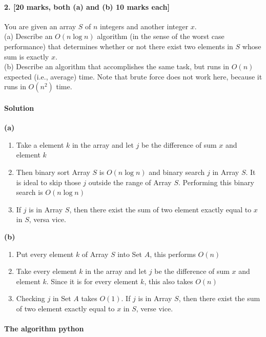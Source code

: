 \documentclass[a4paper]{scrartcl}
\begin{document}
\paragraph{2. [20 marks, both (a) and (b) 10 marks each]}

\label{sec:Question 2}
You are given an array $S$ of $n$ integers and
another integer $x$.\\
(a) Describe an $O(n \log{n})$ algorithm (in the sense of the worst case performance) that determines whether or not there exist two elements in $S$ whose sum is exactly $x$.\\
(b) Describe an algorithm that accomplishes the same task, but runs in $O(n)$ expected (i.e., average) time.
Note that brute force does not work here, because it runs in $O(n^2)$ time.

\paragraph{Solution}
{\bfseries(a)}
\begin{enumerate}
  \item Take a element $k$ in the array and let $j$ be the difference of sum $x$ and element $k$
  \item Then binary sort Array $S$ is $O(n\log{n})$ and binary search $j$ in Array $S$. It is ideal to skip those $j$ outside the range of Array $S$. Performing this binary search is $O(n\log{n})$
  \item If $j$ is in Array $S$, then there exist the sum of two element exactly equal to $x$ in $S$, versa vice.
\end{enumerate}

{\bfseries(b)}
\begin{enumerate}
 \item Put every element $k$ of Array $S$ into Set $A$, this performs $O(n)$
 \item Take every element $k$ in the array and let $j$ be the difference of sum $x$ and element $k$. Since it is for every element $k$, this also takes $O(n)$
 \item Checking $j$ in Set $A$ takes $O(1)$. If $j$ is in Array $S$, then there exist the sum of two element exactly equal to $x$ in $S$, verse vice.
\end{enumerate}

\paragraph{The algorithm python}
\label{sec:code}

\end{document}
